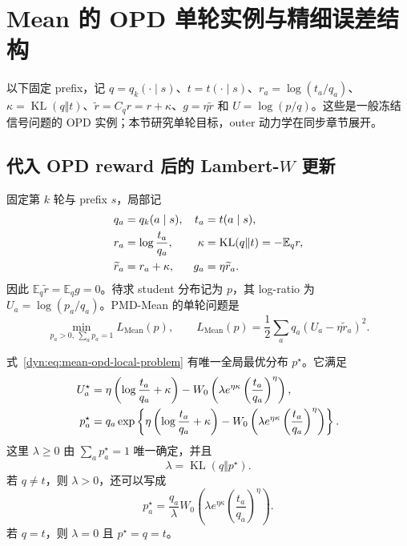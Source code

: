 \documentclass[lang=cn,scheme=chinese,openany]{../book/elegantbook}
\newcommand{\E}{\mathbb E}
\newcommand{\KL}{\operatorname{KL}}
\begin{document}


\section{Mean 的 OPD 单轮实例与精细误差结构}
\label{dyn:mean-static}

以下固定 prefix，记 $q=q_k(\cdot\mid s)$、$t=t(\cdot\mid s)$、$r_a=\log(t_a/q_a)$、$\kappa=\KL(q\Vert t)$、$\widetilde r=C_qr=r+\kappa$、$g=\eta\widetilde r$ 和 $U=\log(p/q)$。这些是一般冻结信号问题的 OPD 实例；本节研究单轮目标，outer 动力学在同步章节展开。

\subsection{代入 OPD reward 后的 Lambert-$W$ 更新}

固定第 $k$ 轮与 prefix $s$，局部记
\begin{align}
 q_a&=q_k(a\mid s), & t_a&=t(a\mid s),\notag\\
 r_a&=\log\frac{t_a}{q_a}, &
 \kappa&=\KL(q\Vert t)=-\E_q r,\notag\\
 \widetilde r_a&=r_a+\kappa, & g_a&=\eta \widetilde r_a.
 \label{dyn:eq:mean-local-opd-definitions}
\end{align}
因此 $\E_q\widetilde r=\E_qg=0$。待求 student 分布记为 $p$，其 log-ratio 为 $U_a=\log(p_a/q_a)$。PMD-Mean 的单轮问题是
\begin{equation}
 \min_{p_a>0,\ \sum_a p_a=1}
 L_{\mathrm{Mean}}(p),
 \qquad
 L_{\mathrm{Mean}}(p)=\frac12\sum_aq_a(U_a-\eta \widetilde r_a)^2.
 \label{dyn:eq:mean-opd-local-problem}
\end{equation}

\begin{theorem}
\label{dyn:thm:mean-opd-explicit}
式~\eqref{dyn:eq:mean-opd-local-problem} 有唯一全局最优分布 $p^\star$。它满足
\begin{align}
 U_a^\star
 &=\eta\left(\log\frac{t_a}{q_a}+\kappa\right)
   -W_0\left(\lambda e^{\eta\kappa}
                      \left(\frac{t_a}{q_a}\right)^\eta\right),\notag\\
 p_a^\star
 &=q_a\exp\left\{\eta\left(\log\frac{t_a}{q_a}+\kappa\right)
   -W_0\left(\lambda e^{\eta\kappa}
                      \left(\frac{t_a}{q_a}\right)^\eta\right)\right\}.
 \label{dyn:eq:mean-opd-W-substituted}
\end{align}
这里 $\lambda\ge0$ 由 $\sum_a p_a^\star=1$ 唯一确定，并且
\begin{equation}
 \lambda=\KL(q\Vert p^\star).
 \label{dyn:eq:mean-opd-multiplier-kl}
\end{equation}
若 $q\ne t$，则 $\lambda>0$，还可以写成
\begin{equation}
 p_a^\star=\frac{q_a}{\lambda}
 W_0\left(\lambda e^{\eta\kappa}
                \left(\frac{t_a}{q_a}\right)^\eta\right).
 \label{dyn:eq:mean-opd-W-ratio}
\end{equation}
若 $q=t$，则 $\lambda=0$ 且 $p^\star=q=t$。
\end{theorem}
\end{document}
